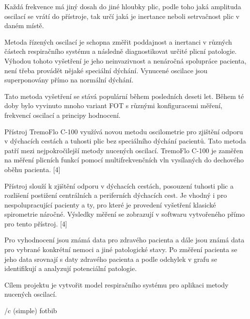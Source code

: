 Každá frekvence má jiný dosah do jiné hloubky plic, podle toho jaká amplituda oscilací se vrátí do přístroje, tak určí jaká je inertance neboli setrvačnost plic v daném místě. 

Metoda řízených oscilací je schopna změřit poddajnost a inertanci v různých částech respiračního systému a následně diagnostikovat určité plicní patologie. 
Výhodou tohoto vyšetření je jeho neinvazivnost a nenáročná spolupráce pacienta, není třeba provádět nějaké speciální dýchání. Vynucené oscilace jsou superponovány přímo na normální dýchání. 

Tato metoda vyšetření se stává populární během posledních deseti let. Během té doby bylo vyvinuto mnoho variant FOT s různými konfiguracemi měření, frekvencí oscilací a principy hodnocení. 

Přístroj TremoFlo C-100 využívá novou metodu oscilometrie pro zjištění odporu  v dýchacích cestách a tuhosti plic bez speciálního dýchání pacientů. Tato metoda patří mezi nejpokročilejší metody nucených oscilací. TremoFlo C-100 je zaměřen na měření plicních funkcí pomocí multifrekvenčních vln vysílaných do dechového oběhu pacienta. [4]

Přístroj slouží k zjištění odporu v dýchacích cestách, posouzení tuhosti plic a rozlišení postižení centrálních a periferních dýchacích cest. Je vhodný i pro nespolupracující pacienty a ty, pro které je provedení vyšetření klasické spirometrie náročné. 
Výsledky měření se zobrazují v softwaru vytvořeného přímo pro tento přístroj. [4]

Pro vyhodnocení jsou známá data pro zdravého pacienta a dále jsou známá data pro vybrané konkrétní nemoci a jiné patologické stavy.  Po změření pacienta se jeho data srovnají s daty zdravého pacienta a podle odchylek v grafu se identifikují a analyzují potenciální patologie. 

Cílem projektu je vytvořit model respiračního systému pro aplikaci metody nucených oscilací. 

\bibchap
\usebib/c (simple) fotbib

\bye
